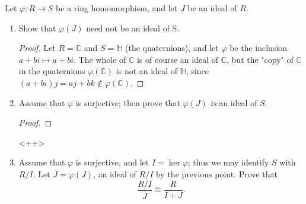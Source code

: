 \documentclass[12pt]{article}
\newenvironment{problem}[2][Problem]{\begin{trivlist}
\item[\hskip \labelsep {\bfseries #1}\hskip \labelsep {\bfseries #2.}]}{\end{trivlist}}
\newenvironment{sproof}{
  \renewcommand\qedsymbol{$\square$}
  \begin{proof}
  }{
  \end{proof}
}
\theoremstyle{remark}
\begin{document}
\begin{problem}{3.3}
Let $\varphi:R\to S$ be a ring homomorphism, and let $J$ be an ideal of $R$.
\end{problem}
\begin{enumerate}
  \item Show that $\varphi(J)$ need not be an ideal of S.
    \begin{sproof}
      Let $R=\mathbb{C}$ and $S=\mathbb{H}$ (the quaternions), and let $\varphi$ be the
      inclusion \\$a+bi\mapsto a+bi$.
      The whole of $\mathbb{C}$ is of course an ideal of $\mathbb{C}$, but
      the "copy" of $\mathbb{C}$ in the quaternions $\varphi(\mathbb{C})$ is not an ideal
      of $\mathbb{H}$, since $(a+bi)j = aj+bk\notin\varphi(\mathbb{C})$.
    \end{sproof}
  \item Assume that $\varphi$ is surjective; then prove that $\varphi(J)$ \textit{is} an ideal of $S$.
    \begin{proof}
      
    \end{proof}<++>
  \item Assume that $\varphi$ is surjective, and let $I=\ker\varphi$; thus we may identify
  $S$ with $R/I$.
  Let $\overline J=\varphi(J)$, an ideal of $R/I$ by the previous point.
  Prove that
  \begin{equation*}
    \frac{R/I}{\overline{J}}\cong\frac{R}{I+J}.
  \end{equation*}
\end{enumerate}
\end{document}
